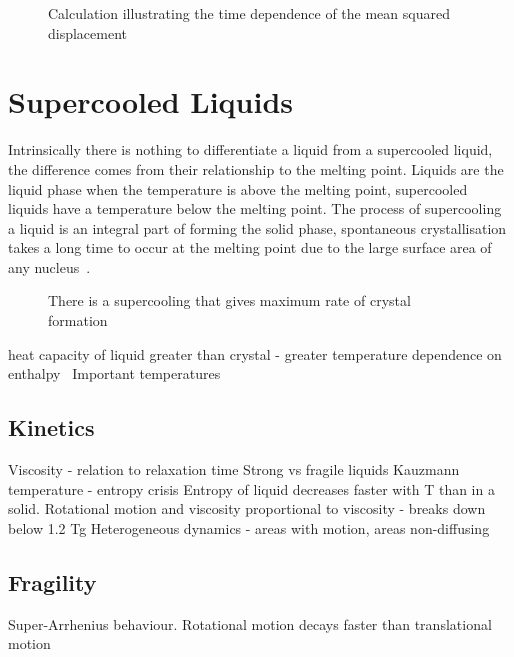 \begin{figure}
    \label{fig:MSD}
    \caption{Calculation illustrating the time dependence of the mean squared displacement}
\end{figure}


\section{Supercooled Liquids}

Intrinsically there is nothing to differentiate a liquid from a supercooled liquid, the difference comes from their relationship to the melting point. Liquids are the liquid phase when the temperature is above the melting point, supercooled liquids have a temperature below the melting point. The process of supercooling a liquid is an integral part of forming the solid phase, spontaneous crystallisation takes a long time to occur at the melting point due to the large surface area of any nucleus~.

\begin{figure}
    \caption{There is a supercooling that gives maximum rate of crystal formation}
    \label{fig:supercool crys}
\end{figure}

\begin{figure}
\end{figure}
heat capacity of liquid greater than crystal - greater temperature dependence on enthalpy~\cite{debenedetti:01}
Important temperatures

\subsection{Kinetics}
Viscosity - relation to relaxation time
Strong vs fragile liquids
Kauzmann temperature - entropy crisis
Entropy of liquid decreases faster with T than in a solid.
Rotational motion and viscosity proportional to viscosity - breaks down below 1.2 Tg
Heterogeneous dynamics - areas with motion, areas non-diffusing

\subsection{Fragility}
Super-Arrhenius behaviour.
Rotational motion decays faster than translational motion


